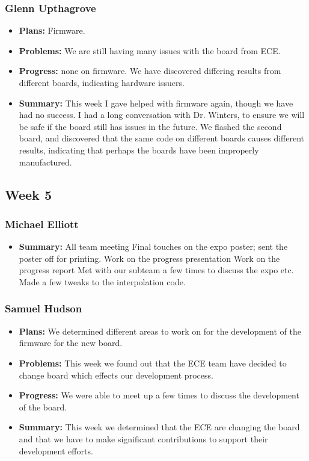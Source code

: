 \documentclass[onecolumn, draftclsnofoot,10pt, compsoc]{IEEEtran}
\begin{document}
\subsubsection{Glenn Upthagrove}
\begin {itemize}
 \item \textbf{Plans: }Firmware.
 \item \textbf{Problems: }We are still having many issues with the board from ECE.    
 \item \textbf{Progress: }none on firmware. We have discovered differing results from different boards, indicating hardware issuers.    
 \item \textbf{Summary: }This week I gave helped with firmware again, though we have had no success. I had a long conversation with Dr. Winters, to ensure we will be safe if the board still has issues in the future. We flashed the second board, and discovered that the same code on different boards causes different results, indicating that perhaps the boards have been improperly manufactured.    
\end {itemize}

\subsection{Week 5}
\subsubsection{Michael Elliott}
\begin {itemize}
 \item \textbf{Summary: }All team meeting
Final touches on the expo poster; sent the poster off for printing.
Work on the progress presentation
Work on the progress report
Met with our subteam a few times to discuss the expo etc.
Made a few tweaks to the interpolation code.
\end{itemize}
\subsubsection{Samuel Hudson}
\begin {itemize}
 \item \textbf{Plans: }We determined different areas to work on for the development of the firmware for the new board. 
 \item \textbf{Problems: }This week we found out that the ECE team have decided to change board which effects our development process. 
 \item \textbf{Progress: }We were able to meet up a few times to discuss the development of the board.
 \item \textbf{Summary: }This week we determined that the ECE are changing the board and that we have to make significant contributions to support their development efforts.
\end {itemize}
\end{document}
